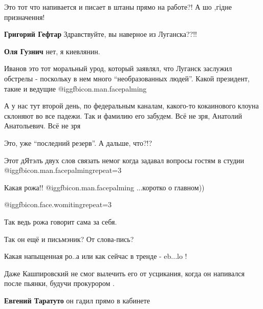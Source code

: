  
 
 
 
 
\zzSecCmt

\begin{itemize} %
Это тот что напивается и писает в штаны прямо на работе?! А шо ,гідне призначення!

\textbf{Григорий Гефтар} Здравствуйте, вы наверное из Луганска??!!

\textbf{Оля Гузнич} нет, я киевлянин.

Иванов это тот моральный урод, который заявлял, что Луганск заслужил обстрелы - поскольку в нем много \enquote{необразованных людей}.
Какой президент, такие и ведущие  @igg{fbicon.man.facepalming} 


А у нас тут второй день, по федеральным каналам, какого-то кокаинового клоуна
склоняют во все падежи. Так и фамилию его забудем. Всё не зря, Анатолий
Анатольевич. Всё не зря


Это, уже \enquote{последний резерв}.
А дальше, что?!?

Этот дЯтэлъ двух слов связать немог когда задавал вопросы гостям в студии @igg{fbicon.man.facepalming}{repeat=3} 

Какая рожа!!  @igg{fbicon.man.facepalming} ...коротко о главном))

 @igg{fbicon.face.womiting}{repeat=3} 

Так ведь рожа говорит сама за себя.

Так он ещё и письмэник? От слова-пись?

Какая напыщенная ро..а или как сейчас в тренде - eb...lo !


Даже Кашпировский не смог вылечить его от усцикания, когда он напивался после пьянки, будучи прокурором .

\textbf{Евгений Таратуто} он гадил прямо в кабинете


\end{itemize}
